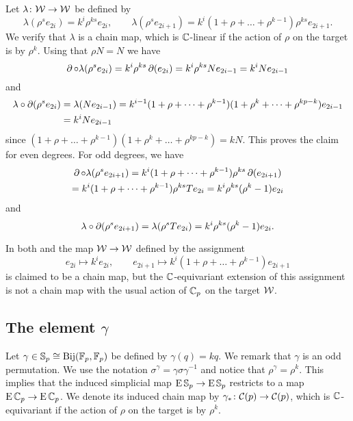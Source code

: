 Let $\lambda \colon \mathcal{W} \to \mathcal{W}$ be defined by
\[
\lambda(\rho^s e_{2i}) = k^i \rho^{ks} e_{2i}, \qquad
\lambda(\rho^s e_{2i+1}) = k^i (1+\rho+\dots+\rho^{k-1}) \rho^{ks} e_{2i+1}.
\]
We verify that $\lambda$ is a chain map, which is $\mathbb{C}$-linear if the action of $\rho$ on the target is by $\rho^k$.
Using that $\rho N = N$ we have
\[
\operatorname{\partial} \mathbin{\circ} \lambda(\rho^s e_{2i}) = k^i \rho^{ks} \operatorname{\partial} (e_{2i}) = k^i \rho^{ks} N e_{2i-1} = k^i N e_{2i-1}
\]
and
\begin{align*}
	\lambda \mathbin{\circ} \operatorname{\partial}(\rho^s e_{2i}) &= \lambda(N e_{2i-1}) = k^{i-1}(1+\rho+\dots+\rho^{k-1}) (1+\rho^k+\dots+\rho^{kp-k}) e_{2i-1} \\ &=
	k^i N e_{2i-1}
\end{align*}
since $(1+\rho+\dots+\rho^{k-1}) (1+\rho^k+\dots+\rho^{kp-k}) = kN$.
This proves the claim for even degrees.
For odd degrees, we have
\begin{multline*}
	\operatorname{\partial} \mathbin{\circ} \lambda(\rho^s e_{2i+1}) = k^i (1+\rho+\dots+\rho^{k-1}) \rho^{ks} \operatorname{\partial} (e_{2i+1}) \\
	= k^i (1+\rho+\dots+\rho^{k-1}) \rho^{ks} T e_{2i} = k^i \rho^{ks} (\rho^k-1) e_{2i}
\end{multline*}
and
\[
\lambda \mathbin{\circ} \operatorname{\partial}(\rho^s e_{2i+1}) = \lambda(\rho^s T e_{2i}) = k^i\rho^{ks}(\rho^k-1) e_{2i}.
\]

\begin{remark*}
	In both \cite[p.219]{steenrod1953cyclic} and \cite[p.159]{may1970general} the map $\mathcal{W} \to \mathcal{W}$ defined by the assignment
	\[
	e_{2i} \mapsto k^i e_{2i}, \qquad
	e_{2i+1} \mapsto k^i (1+\rho+\dots+\rho^{k-1}) e_{2i+1}
	\]
	is claimed to be a chain map, but the $\mathbb{C}$-equivariant extension of this assignment is not a chain map with the usual action of $\mathbb{C}_p$ on the target $\mathcal{W}$.
\end{remark*}

\subsection{The element $\gamma$}

Let $\gamma \in \mathbb{S}_p \cong \mathrm{Bij}({\mathbb{F}_p}, {\mathbb{F}_p})$ be defined by $\gamma(q) = kq$.
We remark that $\gamma$ is an odd permutation.
We use the notation $\sigma^\gamma = \gamma \sigma \gamma^{-1}$
and notice that $\rho^\gamma = \rho^k$.
This implies that the induced simplicial map $\operatorname{E}\mathbb{S}_p \to \operatorname{E}\mathbb{S}_p$ restricts to a map $\operatorname{E}\mathbb{C}_p \to \operatorname{E}\mathbb{C}_p$.
We denote its induced chain map by $\gamma_\ast \colon \mathcal{C}(p) \to \mathcal{C}(p)$, which is $\mathbb{C}$-equivariant if the action of $\rho$ on the target is by $\rho^k$.

